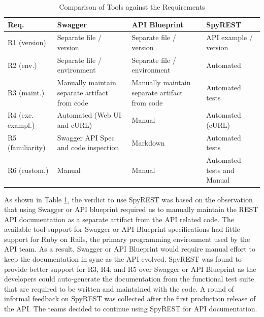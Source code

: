 \documentclass[10pt, conference]{IEEEtran}
\begin{document}
\begin{table}[!tbh]
\caption{Comparison of Tools against the Requirements}
  \label{table:compare}
\begin{tabular}{|p{0.5in} | p{0.8in}| p{0.8in}|p{0.8in}|}

\hline
\textbf{Req}. & \textbf{Swagger} & \textbf{API Blueprint} & \textbf{SpyREST} \\
\hline
R1 (version) & Separate file / version & Separate file / version & API example / version \\
\hline
R2 (env.)& Separate file / environment & Separate file / environment & Automated \\
\hline
R3 (maint.)& Manually maintain separate artifact from code & Manually maintain separate artifact from code & Automated tests \\
\hline
R4 (exe. exampl.)& Automated (Web UI and cURL) & Manual & Automated (cURL) \\
\hline
R5 (familiarity)& Swagger API Spec and code inspection & Markdown & Automated tests \\
\hline
R6 (custom.)& Manual & Manual & Automated tests and Manual \\
\hline
\end{tabular}
\end{table}

As shown in Table \ref{table:compare}, the verdict to use SpyREST was based on the observation that using Swagger or API blueprint required us to manually maintain the REST API documentation as a separate artifact from the API related code. The available tool support for Swagger or API Blueprint specifications had little support for Ruby on Rails, the primary programming environment used by the API team. As a result, Swagger or API Blueprint would require manual effort to keep the documentation in sync as the API evolved. SpyREST was found to provide better support for R3, R4, and R5 over Swagger or API Blueprint as the developers could auto-generate the documentation from the functional test suite that are required to be written and maintained with the code. A round of informal feedback on SpyREST was collected after the first production release of the API. The teams decided to continue using SpyREST for API documentation.
\end{document}
